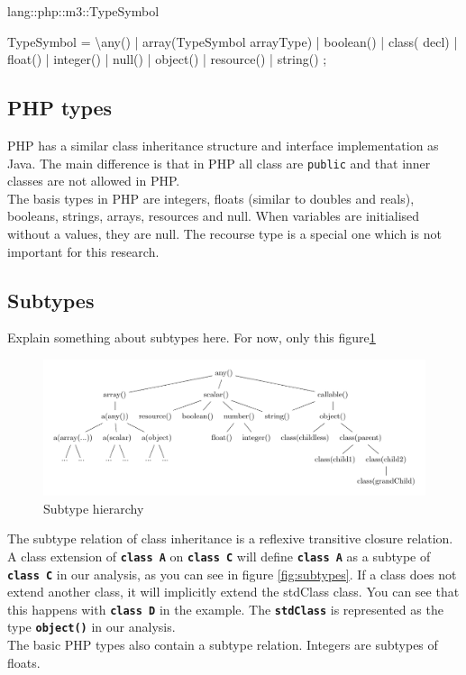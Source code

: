 \documentclass[../main.tex]{subfiles}
\begin{document}
    \begin{rascal}
 lang::php::m3::TypeSymbol

 TypeSymbol
  = \textbackslash{}any()        | array(TypeSymbol arrayType)
  | boolean()     | class( decl)
  | float()       | integer()
  | null()        | object()
  | resource()    | string()
  ;
    \end{rascal}
    
    \subsection{PHP types}
    PHP has a similar class inheritance structure and interface implementation as Java.
    The main difference is that in PHP all class are \texttt{public} and that inner classes are not allowed in PHP. 
    \\
    The basis types in PHP are integers, floats (similar to doubles and reals), booleans, strings, arrays, resources and null.
    When variables are initialised without a values, they are null. The recourse type is a special one which is not important for this research.
 
    \subsection{Subtypes}
    
    Explain something about subtypes here. For now, only this figure\ref{fig:subtypeTree}

    \begin{figure}[H]
        \includegraphics{Diagrams/Subtypes.pdf}
        \caption{Subtype hierarchy}
        \label{fig:subtypeTree}
    \end{figure}

    The subtype relation of class inheritance is a \gls{reflexive transitive closure} relation.
    A class extension of \textbf{\texttt{class A}} on \textbf{\texttt{class C}} will define \textbf{\texttt{class A}} as a subtype of \textbf{\texttt{class C}} in our analysis, as you can see in figure \ref{fig:subtypes}.
    If a class does not extend another class, it will implicitly extend the \gls{stdClass} class.
    You can see that this happens with \textbf{\texttt{class D}} in the example.
    The \textbf{\texttt{stdClass}} is represented as the type \textbf{\texttt{object()}} in our analysis.
    \\
    The basic PHP types also contain a subtype relation.
    Integers are subtypes of floats.
 
\end{document}
